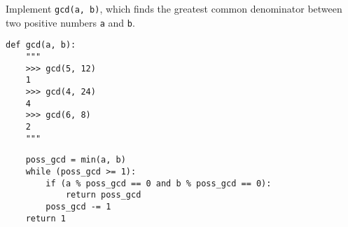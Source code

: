 \begin{blocksection}
\question Implement \lstinline$gcd(a, b)$, which finds the greatest common denominator between two positive numbers \lstinline$a$ and \lstinline$b$.

\begin{lstlisting}
def gcd(a, b):
    """
    >>> gcd(5, 12)
    1
    >>> gcd(4, 24)
    4
    >>> gcd(6, 8)
    2
    """
\end{lstlisting}
\begin{solution}[2in]
\begin{lstlisting}
    poss_gcd = min(a, b)
    while (poss_gcd >= 1):
        if (a % poss_gcd == 0 and b % poss_gcd == 0):
            return poss_gcd
        poss_gcd -= 1
    return 1
\end{lstlisting}
\end{solution}
\end{blocksection}
